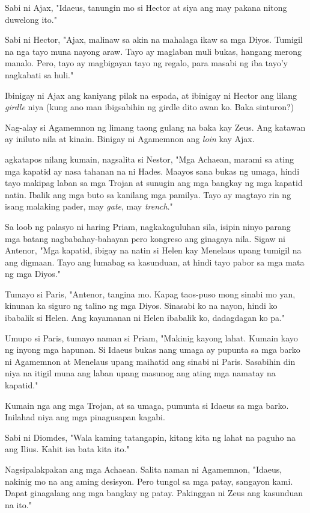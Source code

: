 \documentclass[12pt,letterpaper]{report}
\begin{document}
Sabi ni Ajax, "Idaeus, tanungin mo si Hector at siya ang may pakana nitong duwelong ito."

Sabi ni Hector, "Ajax, malinaw sa akin na mahalaga ikaw sa mga Diyos. Tumigil na nga tayo muna nayong araw. Tayo ay maglaban muli bukas, hangang merong manalo. Pero, tayo ay magbigayan tayo ng regalo, para masabi ng iba tayo'y nagkabati sa huli."

Ibinigay ni Ajax ang kaniyang pilak na espada, at ibinigay ni Hector ang lilang \textit{girdle} niya (kung ano man ibigsabihin ng girdle dito awan ko. Baka sinturon?)

Nag-alay si Agamemnon ng limang taong gulang na baka kay Zeus. Ang katawan ay iniluto nila at kinain. Binigay ni Agamemnon ang \textit{loin} kay Ajax.

agkatapos nilang kumain, nagsalita si Nestor, "Mga Achaean, marami sa ating mga kapatid ay nasa tahanan na ni Hades. Maayos sana bukas ng umaga, hindi tayo makipag laban sa mga Trojan at sunugin ang mga bangkay ng mga kapatid natin. Ibalik ang mga buto sa kanilang mga pamilya. Tayo ay magtayo rin ng isang malaking pader, may \textit{gate}, may \textit{trench}."

Sa loob ng palasyo ni haring Priam, nagkakaguluhan sila, isipin ninyo parang mga batang nagbabahay-bahayan pero kongreso ang ginagaya nila. Sigaw ni Antenor, "Mga kapatid, ibigay na natin si Helen kay Menelaus upang tumigil na ang digmaan. Tayo ang lumabag sa kasunduan, at hindi tayo pabor sa mga mata ng mga Diyos."

Tumayo si Paris, "Antenor, tangina mo. Kapag taos-puso mong sinabi mo yan, kinunan ka siguro ng talino ng mga Diyos. Sinasabi ko na nayon, hindi ko ibabalik si Helen. Ang kayamanan ni Helen ibabalik ko, dadagdagan ko pa."

Umupo si Paris, tumayo naman si Priam, "Makinig kayong lahat. Kumain kayo ng inyong mga hapunan. Si Idaeus bukas nang umaga ay pupunta sa mga barko ni Agamemnon at Menelaus upang maihatid ang sinabi ni Paris. Sasabihin din niya na itigil muna ang laban upang masunog ang ating mga namatay na kapatid."

Kumain nga ang mga Trojan, at sa umaga, pumunta si Idaeus sa mga barko. Inilahad niya ang mga pinagusapan kagabi.

Sabi ni Diomdes, "Wala kaming tatangapin, kitang kita ng lahat na paguho na ang Ilius. Kahit isa bata kita ito."

Nagsipalakpakan ang mga Achaean. Salita naman ni Agamemnon, "Idaeus, nakinig mo na ang aming desisyon. Pero tungol sa mga patay, sangayon kami. Dapat ginagalang ang mga bangkay ng patay. Pakinggan ni Zeus ang kasunduan na ito."
\end{document}
